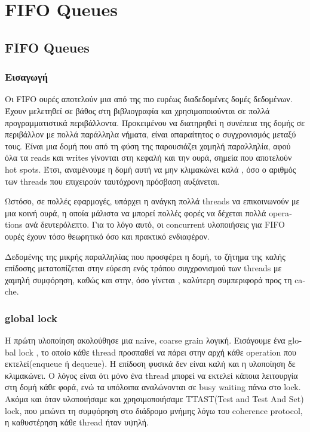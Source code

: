 \def\<#1>{\textit{#1}}

\chapter{\textlatin{FIFO Queues}}
\section{\textlatin{FIFO Queues}}
\subsection{Εισαγωγή}
Οι \textlatin{FIFO} ουρές αποτελούν μια από της πιο ευρέως διαδεδομένες δομές δεδομένων. Έχουν μελετηθεί σε βάθος στη βιβλιογραφία και χρησιμοποιούνται σε πολλά προγραμματιστικά περιβάλλοντα. Προκειμένου να διατηρηθεί η συνέπεια της δομής σε περιβάλλον με πολλά παράλληλα νήματα, είναι απαραίτητος ο συγχρονισμός μεταξύ τους. Είναι μια δομή που από τη φύση της παρουσιάζει χαμηλή παραλληλία, αφού όλα τα \textlatin{reads} και \textlatin{writes} γίνονται στη κεφαλή και την ουρά, σημεία που αποτελούν \textlatin{hot spots}. Έτσι, αναμένουμε η δομή αυτή να μην κλιμακώνει καλά , όσο ο αριθμός των \textlatin{threads} που επιχειρούν ταυτόχρονη πρόσβαση αυξάνεται.

Ωστόσο, σε πολλές εφαρμογές, υπάρχει η ανάγκη πολλά \textlatin{threads} να επικοινωνούν με μια κοινή ουρά, η οποία μάλιστα να μπορεί πολλές φορές να δέχεται πολλά \textlatin{operations} ανά δευτερόλεπτο. Για το λόγο αυτό, οι \textlatin{concurrent}  υλοποιήσεις για \textlatin{FIFO} ουρές έχουν τόσο θεωρητικό όσο και πρακτικό ενδιαφέρον.

Δεδομένης της μικρής παραλληλίας που προσφέρει η δομή, το ζήτημα της καλής επίδοσης μετατοπίζεται στην εύρεση ενός τρόπου συγχρονισμού των \textlatin{threads} με χαμηλή συμφόρηση, καθώς και στην, όσο γίνεται , καλύτερη συμπεριφορά προς τη \textlatin{cache}.

\subsection{\textlatin{global lock}}
H πρώτη υλοποίηση ακολούθησε μια \textlatin{naive, coarse grain} λογική. Εισάγουμε ένα \textlatin{global lock} , το οποίο κάθε \textlatin{thread} προσπαθεί να πάρει στην αρχή κάθε \textlatin{operation} που εκτελεί(\textlatin{enqueue} ή \textlatin{dequeue}). Η επίδοση φυσικά δεν είναι  καλή και  η υλοποίηση δε κλιμακώνει. Ο λόγος είναι ότι μόνο ένα \textlatin{thread}  μπορεί να εκτελεί κάποια λειτουργία στη δομή κάθε φορά, ενώ τα υπόλοιπα αναλώνονται σε \textlatin{busy waiting} πάνω στο \textlatin{lock}. Ακόμα και όταν υλοποιήσαμε και χρησιμοποιήσαμε \textlatin{TTAST(Test and Test And Set) lock}, που μειώνει τη συμφόρηση στο διάδρομο μνήμης λόγω του \textlatin{coherence protocol}, η καθυστέρηση κάθε \textlatin{thread} ήταν υψηλή.

